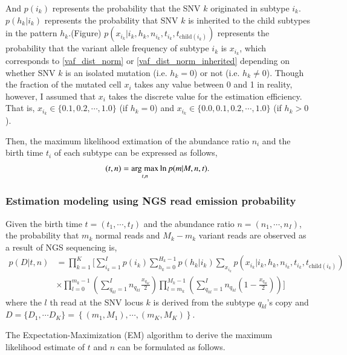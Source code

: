 \documentclass{article}
\begin{document}
And $p(i_k)$ represents the probability that the SNV $k$ originated in subtype $i_k$.
$p(h_k | i_k)$ represents the probability that SNV $k$ is inherited to the child subtypes in the pattern $h_k$.(Figure)
$p(x_{i_k} | i_k, h_k, n_{i_k}, t_{i_k}, t_{\mathrm{child}(i_k)})$ represents the probability that the variant allele frequency of subtype $i_k$ is $x_{i_k}$,
which corresponds to \eqref{vaf_dist_norm} or \eqref{vaf_dist_norm_inherited} depending on whether SNV $k$ is an isolated mutation (i.e. $h_k = 0$) or not (i.e. $h_k \neq 0$).
Though the fraction of the mutated cell $x_i$ takes any value between 0 and 1 in reality, however, I assumed that $x_i$ takes the discrete value for the estimation efficiency. That is, $x_{i_k} \in \{0.1, 0.2, \cdots, 1.0\}$ (if $h_k = 0$) and $x_{i_k} \in \{0.0, 0.1, 0.2, \cdots, 1.0\}$ (if $h_k > 0$).

Then, the maximum likelihood extimation of the abundance ratio $n_i$ and the birth time $t_i$ of each subtype can be expressed as follows,
\begin{align}
 (t, n) = \mathop{\rm arg~max}\limits_{t, n} \ln p(m | M, n, t).\nonumber
\end{align}

\subsubsection{Estimation modeling using NGS read emission probability}
Given the birth time $t = (t_1, \cdots, t_I)$ and the abundance ratio $n = (n_1, \cdots, n_I)$, the probability that $m_k$ normal reads and $M_k - m_k$ variant reads are observed as a result of NGS sequencing is,
\begin{align}
 p(D | t, n) & = \prod_{k=1}^{K} \Biggl[ \sum_{i_k=1}^{I} p(i_k) \sum_{h_k=0}^{H_k - 1} p(h_k | i_k) \sum_{x_{i_k}} p(x_{i_k} | i_k, h_k, n_{i_k}, t_{i_k}, t_{\mathrm{child}(i_k)}) \nonumber\\
 & \times \prod_{l=0}^{m_k - 1} \left( \sum_{q_{kl}=1}^{I} n_{q_{kl}} \frac{x_{q_{kl}}}{2} \right) \prod_{l=m_k}^{M_k - 1} \left( \sum_{q_{kl}=1}^{I} n_{q_{kl}} \left(1-\frac{x_{q_{kl}}}{2} \right) \right) \Biggr]
\end{align}
where the $l$ th read at the SNV locus $k$ is derived from the subtype $q_{kl}$'s copy and $D = \{D_1, \cdots D_K\} = \left\{(m_1, M_1), \cdots, (m_K, M_K) \right\}$.

The Expectation-Maximization (EM) algorithm to derive the maximum likelihood estimate of $t$ and $n$ can be formulated as follows.
\end{document}
